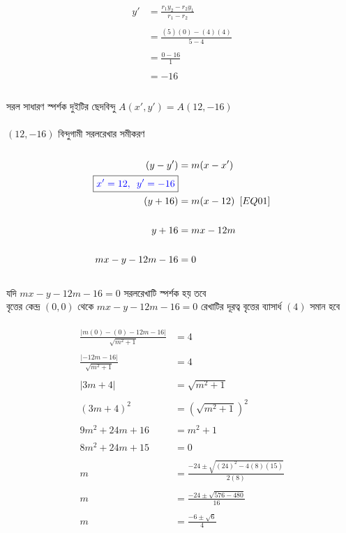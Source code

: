 \documentclass{article}
\begin{document}
\\
\begin{align*}
	y'&=\frac{r_1y_2-r_2y_1}{r_1-r_2}\\
	\\
	&=\frac{(5)(0)-(4)(4)}{5-4}\\
	\\
	&=\frac{0-16}{1}\\
	\\
	&=-16\\
\end{align*}
\\
সরল সাধারণ স্পর্শক দুইটির ছেদবিন্দু $A(x',y')=A(12,-16)$\\
\\
$(12,-16)$ বিন্দুগামী সরলরেখার  সমীকরণ \\
\\ 
\begin{align*}
	(y-y')&=m(x-x')\\
	\boxed{\textcolor{blue}{x'=12,\,\,\,y'=-16}}&\\
	(y+16)&=m(x-12)\,\,\,[EQ01]\\
	\\
	y+16&=mx-12m\\
	\\
	mx-y-12m-16&=0\\
\end{align*}
\\
যদি $mx-y-12m-16=0$ সরলরেখাটি স্পর্শক হয় তবে \\
বৃত্তের কেন্দ্র $(0,0)$ থেকে $mx-y-12m-16=0$ রেখাটির  দূরত্ব  বৃত্তের ব্যাসার্ধ $(4)$ সমান হবে \\
\\  
\begin{align*}
	\frac{|m(0)-(0)-12m-16|}{\sqrt{m^2+1}}&=4\\
	\\
	\frac{|-12m-16|}{\sqrt{m^2+1}}&=4\\
	\\
	|3m+4|&=\sqrt{m^2+1}\\
	\\
	(3m+4)^2&=(\sqrt{m^2+1})^2\\
	\\
	9m^2+24m+16&=m^2+1\\
	\\
	8m^2+24m+15&=0\\
	\\
	m&=\frac{-24\pm\sqrt{(24)^2-4(8)(15)}}{2(8)}\\
	\\
	m&=\frac{-24\pm\sqrt{576-480}}{16}\\
	\\
	m&=\frac{-6\pm\sqrt{6}}{4}\\
\end{align*}
\end{document}
